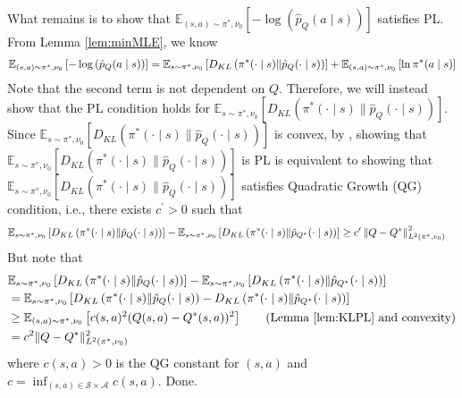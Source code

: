 \noindent What remains is to show that $\mathbb{E}_{(s, a) \sim \pi^*, \nu_0}\left[-\log \left(\hat{p}_Q(a \mid s)\right)\right]$ satisfies PL. From Lemma \ref{lem:minMLE}, we know
\begin{align}
\mathbb{E}_{(s, a) \sim \pi^*, \nu_0}\left[-\log \left(\hat{p}_Q(a \mid s)\right)\right] =\mathbb{E}_{s \sim \pi^*, \nu_0}\left[D_{K L}\left(\pi^*(\cdot \mid s) \| \hat{p}_Q(\cdot \mid s)\right)\right]+\mathbb{E}_{(s, a) \sim \pi^*, \nu_0}\left[\ln \pi^*(a \mid s)\right] \notag
\end{align}
Note that the second term is not dependent on $Q$. Therefore, we will instead show that the PL condition holds for $\mathbb{E}_{s \sim \pi^*, \nu_0}\left[D_{K L}\left(\pi^*(\cdot \mid s) \| \hat{p}_Q(\cdot \mid s)\right)\right]$. Since $\mathbb{E}_{s \sim \pi^*, \nu_0}\left[D_{K L}\left(\pi^*(\cdot \mid s) \| \hat{p}_Q(\cdot \mid s)\right)\right]$ is convex, by \cite{liao2024error}, showing that  $\mathbb{E}_{s \sim \pi^*, \nu_0}\left[D_{K L}\left(\pi^*(\cdot \mid s) \| \hat{p}_Q(\cdot \mid s)\right)\right]$ is PL is equivalent to showing that $\mathbb{E}_{s \sim \pi^*, \nu_0}\left[D_{K L}\left(\pi^*(\cdot \mid s) \| \hat{p}_Q(\cdot \mid s)\right)\right]$ satisfies Quadratic Growth (QG) condition, i.e., there exists $c^\prime>0$ such that
\begin{align}
    &\mathbb{E}_{s \sim \pi^*, \nu_0}\left[D_{K L}\left(\pi^*(\cdot \mid s) \| \hat{p}_Q(\cdot \mid s)\right)\right]-\mathbb{E}_{s \sim \pi^*, \nu_0}\left[D_{K L}\left(\pi^*(\cdot \mid s) \| \hat{p}_{Q^\ast}(\cdot \mid s)\right)\right] \geq 
c^{\prime}\left\|Q-Q^*\right\|_{L^2\left(\pi^*, v_0\right)}^2 \notag
\end{align}
\noindent But note that
\begin{align}
    &\mathbb{E}_{s \sim \pi^*, \nu_0}\left[D_{K L}\left(\pi^*(\cdot \mid s) \| \hat{p}_Q(\cdot \mid s)\right)\right]-\mathbb{E}_{s \sim \pi^*, \nu_0}\left[D_{K L}\left(\pi^*(\cdot \mid s) \| \hat{p}_{Q^\ast}(\cdot \mid s)\right)\right] \notag
     \\
     &=\mathbb{E}_{s \sim \pi^*, \nu_0}\left[D_{K L}\left(\pi^*(\cdot \mid s) \| \hat{p}_Q(\cdot \mid s)\right)-D_{K L}\left(\pi^*(\cdot \mid s) \| \hat{p}_{Q^\ast}(\cdot \mid s)\right)\right] \notag
     \\
    &\ge \mathbb{E}_{(s, a) \sim \pi^*, \nu_0}\left[c(s,a)^2(Q(s,a)-Q^\ast(s,a))^2\right] \tag{Lemma \ref{lem:KLPL} and convexity}
    \\
    &=c^2\|Q-Q^\ast\|^2_{L^2(\pi^\ast, \nu_0)} \notag
\end{align}
\noindent where $c(s,a)>0$ is the QG constant for $(s,a)$ and $c = \inf_{(s,a)\in \mathcal{S}\times\mathcal{A}} c(s,a)$. Done. \QED


